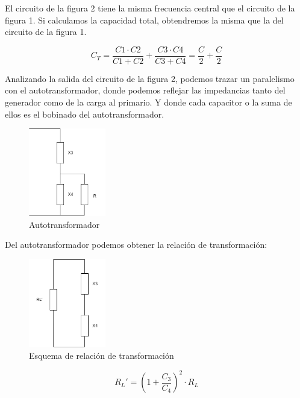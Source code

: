 El circuito de la figura 2 tiene la misma frecuencia central que el circuito de la figura 1. Si calculamos la capacidad total, obtendremos la misma que la del circuito de la figura 1.

\begin{equation}
    C_T = \frac{C1 \cdot C2}{C1 + C2} + \frac{C3 \cdot C4}{C3 + C4} = \frac{C}{2} + \frac{C}{2} 
\end{equation}

Analizando la salida del circuito de la figura 2, podemos trazar un paralelismo con el autotransformador, donde podemos reflejar las impedancias tanto del 
generador como de la carga al primario. Y donde cada capacitor o la suma de ellos es el bobinado del autotransformador.

\begin{figure}[h]
    \centering
    \includegraphics[width=0.3\textwidth]{Imagenes/Esquema_autotrafo.png}
    \caption{Autotransformador}
\end{figure}

Del autotransformador podemos obtener la relación de transformación:

\begin{figure}[h]
    \centering
    \includegraphics[width=0.3\textwidth]{Imagenes/relacion_transformacion.png}
    \caption{Esquema de relación de transformación}
\end{figure}

\begin{equation}
    R_L' = (1 + \frac{C_3}{C_4})^2 \cdot R_L 
\end{equation}

